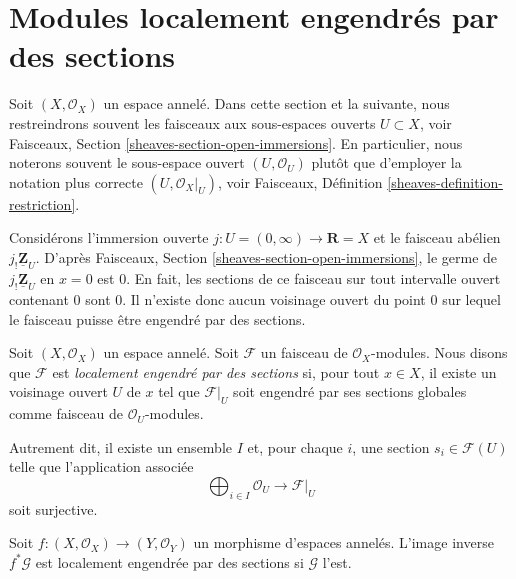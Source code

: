 \section{Modules localement engendrés par des sections}
\label{section-locally-generated}

\noindent
Soit $(X, \mathcal{O}_X)$ un espace annelé. Dans cette section et la suivante,
nous restreindrons souvent les faisceaux aux sous-espaces ouverts
$U \subset X$, voir Faisceaux, Section
\ref{sheaves-section-open-immersions}. En particulier, nous noterons souvent
le sous-espace ouvert $(U, \mathcal{O}_U)$ plutôt que d'employer la notation
plus correcte $(U, \mathcal{O}_X|_U)$, voir Faisceaux, Définition
\ref{sheaves-definition-restriction}.

\medskip\noindent
Considérons l'immersion ouverte
$j : U = (0 , \infty) \to \mathbf{R} = X$ et le faisceau abélien
$j_!\underline{\mathbf{Z}}_U$. D'après Faisceaux, Section
\ref{sheaves-section-open-immersions}, le germe de
$j_!\underline{\mathbf{Z}}_U$ en $x = 0$ est $0$. En fait, les sections de ce
faisceau sur tout intervalle ouvert contenant $0$ sont $0$. Il n'existe donc
aucun voisinage ouvert du point $0$ sur lequel le faisceau puisse être engendré
par des sections.

\begin{definition}
\label{definition-locally-generated}
Soit $(X, \mathcal{O}_X)$ un espace annelé. Soit $\mathcal{F}$ un faisceau de
$\mathcal{O}_X$-modules. Nous disons que $\mathcal{F}$ est
{\it localement engendré par des sections} si, pour tout $x \in X$, il existe
un voisinage ouvert $U$ de $x$ tel que $\mathcal{F}|_U$ soit engendré par ses
sections globales comme faisceau de $\mathcal{O}_U$-modules.
\end{definition}

\noindent
Autrement dit, il existe un ensemble $I$ et, pour chaque $i$, une section
$s_i \in \mathcal{F}(U)$ telle que l'application associée
$$
\bigoplus\nolimits_{i \in I} \mathcal{O}_U
\longrightarrow
\mathcal{F}|_U
$$
soit surjective.

\begin{lemma}
\label{lemma-pullback-locally-generated}
Soit $f : (X, \mathcal{O}_X) \to (Y, \mathcal{O}_Y)$ un morphisme d'espaces
annelés. L'image inverse $f^*\mathcal{G}$ est localement engendrée par des
sections si $\mathcal{G}$ l'est.
\end{lemma}


